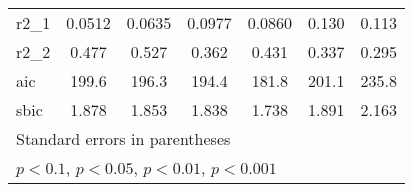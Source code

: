 \begin{table}
\begin{center}
{\begin{tabular}{l*{6}{c}}
r2\_1      &   0.0512         &   0.0635         &   0.0977         &   0.0860         &    0.130         &    0.113         \\
r2\_2      &    0.477         &    0.527         &    0.362         &    0.431         &    0.337         &    0.295         \\
aic       &    199.6         &    196.3         &    194.4         &    181.8         &    201.1         &    235.8         \\
sbic      &    1.878         &    1.853         &    1.838         &    1.738         &    1.891         &    2.163         \\
\hline\hline
\multicolumn{7}{l}{\footnotesize Standard errors in parentheses}\\
\multicolumn{7}{l}{\footnotesize \sym{+} \(p<0.1\), \sym{*} \(p<0.05\), \sym{**} \(p<0.01\), \sym{***} \(p<0.001\)}\\
\end{tabular}
}

\end{center}
\end{table}

